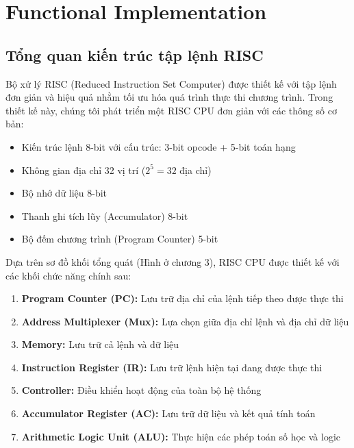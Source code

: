 \chapter{Functional Implementation}
\section{Tổng quan kiến trúc tập lệnh RISC}
Bộ xử lý RISC (Reduced Instruction Set Computer) được thiết kế với tập lệnh đơn giản và hiệu quả nhằm tối ưu hóa quá trình thực thi chương trình. Trong thiết kế này, chúng tôi phát triển một RISC CPU đơn giản với các thông số cơ bản:

\begin{itemize}
    \item Kiến trúc lệnh 8-bit với cấu trúc: 3-bit opcode + 5-bit toán hạng

    \item Không gian địa chỉ 32 vị trí ($2^{5} = 32$ địa chỉ)

    \item Bộ nhớ dữ liệu 8-bit
    
    \item Thanh ghi tích lũy (Accumulator) 8-bit
    \item Bộ đếm chương trình (Program Counter) 5-bit
   
\end{itemize}

Dựa trên sơ đồ khối tổng quát (Hình ở chương 3), RISC CPU được thiết kế với các khối chức năng chính sau:

\begin{enumerate}

    \item \textbf{Program Counter (PC): }Lưu trữ địa chỉ của lệnh tiếp theo được thực thi
    \item \textbf{Address Multiplexer (Mux): }Lựa chọn giữa địa chỉ lệnh và địa chỉ dữ liệu
    \item \textbf{Memory: } Lưu trữ cả lệnh và dữ liệu

    \item \textbf{Instruction Register (IR): }Lưu trữ lệnh hiện tại đang được thực thi
    \item \textbf{Controller: }Điều khiển hoạt động của toàn bộ hệ thống
    \item \textbf{Accumulator Register (AC): }Lưu trữ dữ liệu và kết quả tính toán
    \item \textbf{Arithmetic Logic Unit (ALU): }Thực hiện các phép toán số học và logic
\end{enumerate}

